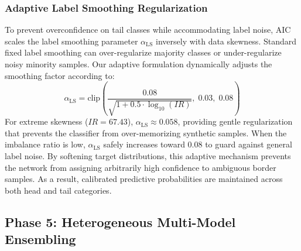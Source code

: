 \documentclass{ieeeaccess}
\begin{document}
\subsubsection{Adaptive Label Smoothing Regularization}
To prevent overconfidence on tail classes while accommodating label noise, AIC scales the label smoothing parameter $\alpha_{\text{LS}}$ inversely with data skewness. Standard fixed label smoothing can over-regularize majority classes or under-regularize noisy minority samples. Our adaptive formulation dynamically adjusts the smoothing factor according to:
\begin{equation}
\label{eq:label_smoothing}
    \alpha_{\text{LS}} = \text{clip}\left(\frac{0.08}{\sqrt{1 + 0.5 \cdot \log_{10}(IR)}}, \; 0.03, \; 0.08\right)
\end{equation}
For extreme skewness ($IR=67.43$), $\alpha_{\text{LS}} \approx 0.058$, providing gentle regularization that prevents the classifier from over-memorizing synthetic samples. When the imbalance ratio is low, $\alpha_{\text{LS}}$ safely increases toward $0.08$ to guard against general label noise. By softening target distributions, this adaptive mechanism prevents the network from assigning arbitrarily high confidence to ambiguous border samples. As a result, calibrated predictive probabilities are maintained across both head and tail categories.

\subsection{Phase 5: Heterogeneous Multi-Model Ensembling}
\label{subsec:phase5}
\end{document}
